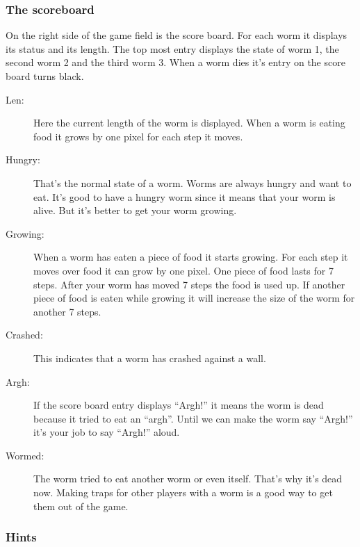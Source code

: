 \subsubsection{The scoreboard}
On the right side of the game field is the score board. For each worm it
displays its status and its length. The top most entry displays the
state of worm 1, the second worm 2 and the third worm 3. When a worm
dies it's entry on the score board turns black.

\begin{description}
\item[Len:]
Here the current length of the worm is displayed. When a worm is eating
food it grows by one pixel for each step it moves. 

\item[Hungry:]
That's the normal state of a worm. Worms are always
hungry and want to eat. It's good to have a hungry
worm since it means that your worm is alive. But it's
better to get your worm growing. 

\item[Growing:]
When a worm has eaten a piece of food it starts growing. For each step
it moves over food it can grow by one pixel. One piece of food lasts
for 7 steps. After your worm has moved 7 steps the food is used up. If
another piece of food is eaten while growing it will increase the size
of the worm for another 7 steps. 

\item[Crashed:]
This indicates that a worm has crashed against a wall.

\item[Argh:]
If the score board entry displays ``Argh!'' it
means the worm is dead because it tried to eat an ``argh''. Until we
can make the worm say ``Argh!'' it's your job to say ``Argh!'' aloud.

\item[Wormed:]
The worm tried to eat another worm or even itself.
That's why it's dead now.  Making traps for other players with a worm
is a good way to get them out of the game.
\end{description}

\subsubsection{Hints}

